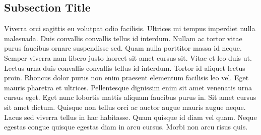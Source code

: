 \documentclass[10pt,letterpaper,twocolumn]{article}
\begin{document}
\subsection{Subsection Title}

Viverra orci sagittis eu volutpat odio facilisis. Ultrices mi tempus imperdiet nulla malesuada. Duis convallis convallis tellus id interdum. Nullam ac tortor vitae purus faucibus ornare suspendisse sed. Quam nulla porttitor massa id neque. Semper viverra nam libero justo laoreet sit amet cursus sit. Vitae et leo duis ut. Lectus urna duis convallis convallis tellus id interdum. Tortor id aliquet lectus proin. Rhoncus dolor purus non enim praesent elementum facilisis leo vel. Eget mauris pharetra et ultrices. Pellentesque dignissim enim sit amet venenatis urna cursus eget. Eget nunc lobortis mattis aliquam faucibus purus in. Sit amet cursus sit amet dictum. Quisque non tellus orci ac auctor augue mauris augue neque. Lacus sed viverra tellus in hac habitasse. Quam quisque id diam vel quam. Neque egestas congue quisque egestas diam in arcu cursus. Morbi non arcu risus quis.\autocites[Lorem ipsum...][]{article-one}{article-two}
\end{document}
